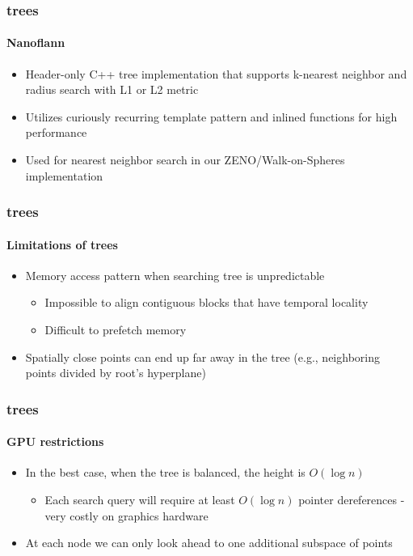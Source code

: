 \begin{frame}
  \frametitle{\kd trees}
  \framesubtitle{Nanoflann}

  \begin{itemize}
    \item Header-only C++ \kd tree implementation that supports k-nearest neighbor and radius search with 
      L1 or L2 metric
    \item Utilizes curiously recurring template pattern and inlined functions for high performance
    \item Used for nearest neighbor search in our ZENO/Walk-on-Spheres implementation 
  \end{itemize}

\end{frame}


\begin{frame}
  \frametitle{\kd trees}
  \framesubtitle{Limitations of trees}

  \begin{itemize}
    \item Memory access pattern when searching tree is unpredictable
      \begin{itemize}
        \item Impossible to align contiguous blocks that have temporal locality
        \item Difficult to prefetch memory
      \end{itemize}
    \item Spatially close points can end up far away in the tree (e.g., neighboring points divided by 
      root's hyperplane)
  \end{itemize}
\end{frame}

\begin{frame}
  \frametitle{\kd trees}
  \framesubtitle{GPU restrictions}

  \begin{itemize}
    \item In the best case, when the tree is balanced, the height is $O(\log n)$
      \begin{itemize}
        \item Each search query will require at least $O(\log n )$ pointer dereferences - very costly on graphics 
          hardware
      \end{itemize}
    \item At each node we can only look ahead to one additional subspace of points
  \end{itemize}
\end{frame}


